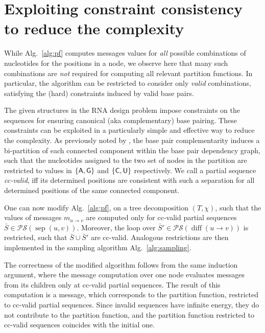 \documentclass[10pt]{article}
\newcommand{\val}{\bar S} %
\newcommand{\separator}[2]{\operatorname{sep}(#1,#2)}
\newcommand{\difference}[2]{\operatorname{diff}(#1 \rightarrow #2)}
\newcommand{\Message}[2]{m_{#1\rightarrow #2}}
\newcommand{\partseqs}{\mathcal{P\!S}}
\newcommand{\Def}[1]{\emph{#1}}
\newcommand{\Nuc}[1]{{\sf #1}}
\newcommand{\Ab}{\Nuc{A}}
\newcommand{\Cb}{\Nuc{C}}
\newcommand{\Gb}{\Nuc{G}}
\newcommand{\Ub}{\Nuc{U}}
\newcommand{\substitute}[2]{#1\cup#2}
\newcommand{\citet}[1]{\cite{#1}}
\begin{document}
    \section{Exploiting constraint consistency to reduce the complexity}
    \label{appsec:improvedComplexity}

    While Alg.~\ref{alg:pf} computes messages values for
    \emph{all} possible combinations of nucleotides for the positions
    in a node,
    we observe here that many such combinations are \emph{not} required for computing all relevant
    partition functions. In particular, the algorithm can be restricted to
    consider only \Def{valid} combinations, satisfying the (hard)
    constraints induced by valid base pairs.

    The given structures in the RNA design problem impose constraints on
    the sequences for ensuring canonical (aka complementary)
    base pairing. These constraints can be exploited in a particularly
    simple and effective way to reduce the complexity.  As previously
    noted by \citet{Flamm2001}, the base pair complementarity induces a
    bi-partition of each connected component within the base pair
    dependency graph, such that the nucleotides assigned to the two set of
    nodes in the partition are restricted to values in $\{\Ab,\Gb\}$ and
    $\{\Cb,\Ub\}$ respectively. We call a partial sequence \Def{cc-valid},
    iff its determined positions are consistent with such a separation for
    all determined positions of the same connected component.


    One can now modify Alg.~\ref{alg:pf}, on a tree decomposition
    $(T,\chi)$, such that the values of messages
    $\Message{u}{v}$ are computed only for cc-valid
    partial sequences $\val\in\partseqs(\separator{u}{v})$. Moreover, the
    loop over $\val'\in\partseqs(\difference{u}{v})$ is restricted, such
    that $\substitute{\val}{\val'}$ are cc-valid. Analogous restrictions are
    then implemented in the sampling algorithm Alg.~\ref{alg:sampling}.

    The correctness of the modified algorithm follows from the same
    induction argument, where the message computation over one node
    evaluates messages from its children only at cc-valid partial
    sequences. The result of this computation is a message, which corresponds
    to the partition function, restricted to cc-valid partial sequences.
    Since invalid sequences have infinite energy, they do not contribute to
    the partition function, and the partition function restricted to cc-valid sequences coincides
    with the initial one.
\end{document}
